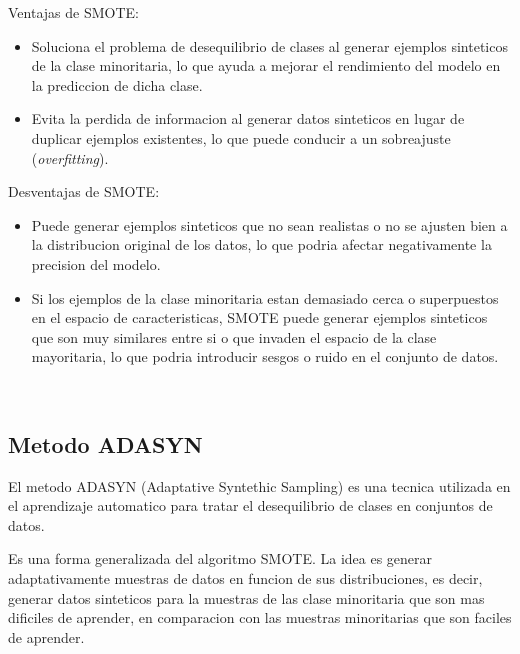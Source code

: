 \documentclass[12pt]{article}
\begin{document}
Ventajas de SMOTE:
\begin{itemize}
    \item Soluciona el problema de desequilibrio de clases al generar ejemplos sinteticos de la clase minoritaria, lo que ayuda a mejorar el rendimiento del modelo en la prediccion de dicha clase.
    \item Evita la perdida de informacion al generar datos sinteticos en lugar de duplicar ejemplos existentes, lo que puede conducir a un sobreajuste (\textit{overfitting}).
\end{itemize}

Desventajas de SMOTE:
\begin{itemize}
    \item Puede generar ejemplos sinteticos que no sean realistas o no se ajusten bien a la distribucion original de los datos, lo que podria afectar negativamente la precision del modelo.
    \item Si los ejemplos de la clase minoritaria estan demasiado cerca o superpuestos en el espacio de caracteristicas, SMOTE puede generar ejemplos sinteticos que son muy similares entre si o que invaden el espacio de la clase mayoritaria, lo que podria introducir sesgos o ruido en el conjunto de datos.
\end{itemize}
~\cite{De0a100enIA}

\subsection{Metodo ADASYN}
El metodo ADASYN (Adaptative Syntethic Sampling) es una tecnica utilizada en el aprendizaje automatico para tratar el desequilibrio de clases en conjuntos de datos.

Es una forma generalizada del algoritmo SMOTE. La idea es generar adaptativamente muestras de datos en funcion de sus distribuciones, es decir, generar datos sinteticos para la muestras de las clase minoritaria que son mas dificiles de aprender, en comparacion con las muestras minoritarias que son faciles de aprender.
\end{document}
